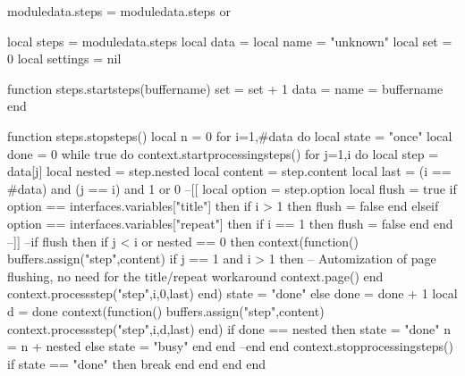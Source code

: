 


\unprotect

\startluacode

moduledata.steps = moduledata.steps or { }

local steps      = moduledata.steps
local data       = { }
local name       = "unknown"
local set        = 0
local settings   = nil

function steps.startsteps(buffername)
    set  = set + 1
    data = { }
    name = buffername
end

function steps.stopsteps()
    local n = 0
    for i=1,#data do
        local state = "once"
        local done  = 0
        while true do
            context.startprocessingsteps()
            for j=1,i do
                local step    = data[j]
                local nested  = step.nested
                local content = step.content
                local last    = (i == #data) and (j == i) and 1 or 0
                --[[
								local option = step.option
								local flush  = true
                if option == interfaces.variables["title"] then
                    if i > 1 then
                        flush = false
                    end
                elseif option == interfaces.variables["repeat"] then
                    if i == 1 then
                        flush = false
                    end
                end 
								--]]
                --if flush then
                    if j < i or nested == 0 then
                        context(function()
														buffers.assign("step",content)
                            if j == 1 and i > 1 then -- Automization of page flushing, no need for the title/repeat workaround
																context.page()
														end
														context.processstep("step",i,0,last)
                        end)
                        state = "done"
                    else
                        done = done + 1
                        local d = done
                        context(function()
                            buffers.assign("step",content)
                            context.processstep("step",i,d,last)
                        end)
                        if done == nested then
                            state = "done"
                            n = n + nested
                        else
                            state = "busy"
                        end
                    end
                --end
            end
            context.stopprocessingsteps()
            if state == "done" then
                break
            end
        end
    end
end

